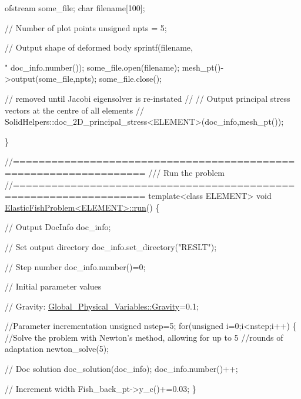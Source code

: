\begin{DoxyCodeInclude}
 ofstream some\_file;
 \textcolor{keywordtype}{char} filename[100];

 \textcolor{comment}{// Number of plot points}
 \textcolor{keywordtype}{unsigned} npts = 5; 

 \textcolor{comment}{// Output shape of deformed body}
 sprintf(filename,\textcolor{stringliteral}{"%
         doc\_info.number());
 some\_file.open(filename);
 mesh\_pt()->output(some\_file,npts);
 some\_file.close();

 \textcolor{comment}{// removed until Jacobi eigensolver is re-instated}
 \textcolor{comment}{// // Output principal stress vectors at the centre of all elements}
 \textcolor{comment}{// SolidHelpers::doc\_2D\_principal\_stress<ELEMENT>(doc\_info,mesh\_pt());}

\}
 

\textcolor{comment}{//==================================================================}\textcolor{comment}{}
\textcolor{comment}{/// Run the problem}
\textcolor{comment}{}\textcolor{comment}{//==================================================================}
\textcolor{keyword}{template}<\textcolor{keyword}{class} ELEMENT>
\textcolor{keywordtype}{void} \hyperlink{classElasticFishProblem_aaaf23036d8f282cff88e497ad214237f}{ElasticFishProblem<ELEMENT>::run}()
\{

 \textcolor{comment}{// Output}
 DocInfo doc\_info;

 \textcolor{comment}{// Set output directory}
 doc\_info.set\_directory(\textcolor{stringliteral}{"RESLT"});

 \textcolor{comment}{// Step number}
 doc\_info.number()=0;
 
 \textcolor{comment}{// Initial parameter values}
 
 \textcolor{comment}{// Gravity:}
 \hyperlink{namespaceGlobal__Physical__Variables_a8b80d3e8d63b8d0a0ed435a2dd7fe2ad}{Global\_Physical\_Variables::Gravity}=0.1; 
 
 \textcolor{comment}{//Parameter incrementation}
 \textcolor{keywordtype}{unsigned} nstep=5; 
 \textcolor{keywordflow}{for}(\textcolor{keywordtype}{unsigned} i=0;i<nstep;i++)
  \{
   \textcolor{comment}{//Solve the problem with Newton's method, allowing for up to 5 }
   \textcolor{comment}{//rounds of adaptation}
   newton\_solve(5);

   \textcolor{comment}{// Doc solution}
   doc\_solution(doc\_info);
   doc\_info.number()++;

   \textcolor{comment}{// Increment width}
   Fish\_back\_pt->y\_c()+=0.03;
  \}

}
\end{DoxyCodeInclude}
